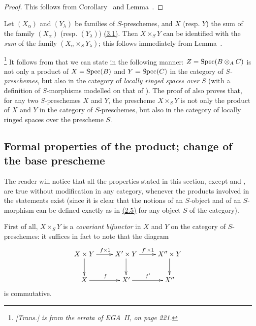 \begin{proof}
\label{proof-1.3.2.7}
This follows from Corollary~ and Lemma~.
\end{proof}

\begin{env}[3.2.8]
\label{1.3.2.8}
Let $(X_\alpha)$ and $(Y_\lambda)$ be families of $S$-preschemes, and $X$ (resp. $Y$) the sum
of the family $(X_\alpha)$ (resp. $(Y_\lambda)$) \hyperref[subsection:1.3.1]{(3.1)}.
Then $X\times_S Y$ can be identified with the \emph{sum} of the family $(X_\alpha\times_S Y_\lambda)$; this follows immediately from Lemma~.
\end{env}

\begin{env}[3.2.9]
\label{1.3.2.9}
\footnote{\emph{[Trans.]  is from the errata of EGA~II, on page 221.}}
It follows from  that we can state  in the following
manner: $Z=\operatorname{Spec}(B\otimes_A C)$ is not only a product of $X=\operatorname{Spec}(B)$ and $Y=\operatorname{Spec}(C)$ in the
category of \emph{$S$-preschemes}, but also in the category of \emph{locally ringed spaces
over $S$} (with a definition of $S$-morphisms modelled on that of ). The
proof of  also proves that, for any two $S$-preschemes $X$ and $Y$, the
prescheme $X\times_S Y$ is not only the product of $X$ and $Y$ in the category of
$S$-preschemes, but also in the category of locally ringed spaces over the prescheme $S$.
\end{env}

\subsection{Formal properties of the product; change of the base prescheme}
\label{subsection:1.3.3}

\begin{env}[3.3.1]
\label{1.3.3.1}
The reader will notice that all the properties stated in this section, except
 and , are true without modification in any
category, whenever the products involved in the statements exist (since it is
clear that the notions of an $S$-object and of an $S$-morphism can be defined
exactly as in \hyperref[subsection:1.2.5]{(2.5)} for any object $S$ of the category).
\end{env}

\begin{env}[3.3.2]
\label{1.3.3.2}
First of all, $X\times_S Y$ is a \emph{covariant bifunctor} in $X$ and $Y$ on the
category of $S$-preschemes: it suffices in fact to note that the diagram
\[
  \xymatrix{
    X\times Y\ar[r]^{f\times 1}\ar[d] &
    X'\times Y\ar[r]^{f'\times 1}\ar[d] &
    X''\times Y\ar[d]\\
    X\ar[r]^f &
    X'\ar[r]^{f'} &
    X''
  }
\]
is commutative.
\end{env}

